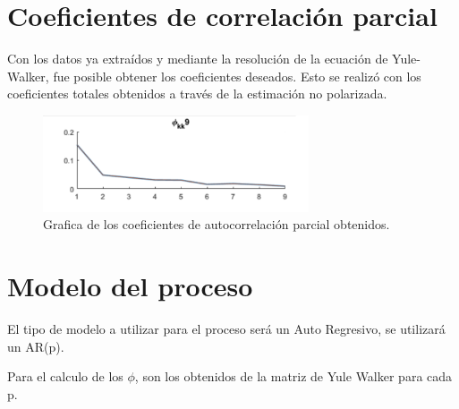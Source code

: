 \section{Coeficientes de correlación parcial}

Con los datos ya extraídos y mediante la resolución de la ecuación de Yule-Walker, fue posible obtener los coeficientes deseados. Esto se realizó con los coeficientes totales obtenidos a través de la estimación no polarizada.
\begin{figure}[H]
\centering
	\includegraphics[width=0.7\textwidth, trim = {0 0 0 0},clip]{./Imagenes/phikk.png}
	\caption{Grafica de los coeficientes de autocorrelación parcial obtenidos.}
	\label{fig:phikk}
\end{figure}


\section{Modelo del proceso}
\label{subsec:modelo}

El tipo de modelo a utilizar para el proceso será un Auto Regresivo, se utilizará un AR(p).

Para el calculo de los $\phi$, son los obtenidos de la matriz de Yule Walker para cada p.

